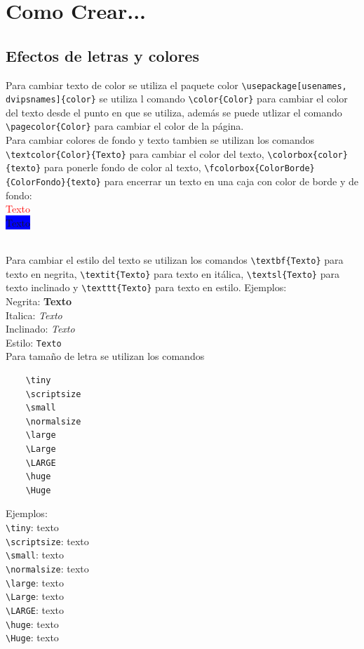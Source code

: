 \documentclass[10pt,journal,compsoc]{IEEEtran}
\begin{document}
\section{Como Crear...}
\subsection{Efectos de letras y colores}
Para cambiar texto de color se utiliza el paquete color \verb|\usepackage[usenames, dvipsnames]{color}| se utiliza l comando \verb|\color{Color}| para cambiar el color del texto desde el punto en que se utiliza, adem\'as se puede utlizar el comando \verb|\pagecolor{Color}| para cambiar el color de la p\'agina.\\
Para cambiar colores de fondo y texto tambien se utilizan los comandos \verb|\textcolor{Color}{Texto}| para cambiar el color del texto, \verb|\colorbox{color}{texto}| para ponerle fondo de color al texto, \verb|\fcolorbox{ColorBorde}{ColorFondo}{texto}| para encerrar un texto en una caja con color de borde y de fondo:\\
\textcolor{red}{Texto}\\\newline
\colorbox{blue}{Texto}\\\newline
{}\\\newline

Para cambiar el estilo del texto se utilizan los comandos \verb|\textbf{Texto}| para texto en negrita, \verb|\textit{Texto}| para texto en it\'alica, \verb|\textsl{Texto}| para texto inclinado y \verb|\texttt{Texto}| para texto en estilo. Ejemplos:\\
Negrita: \textbf{Texto}\\
Italica: \textit{Texto}\\
Inclinado: \textsl{Texto}\\
Estilo: \texttt{Texto}\\
Para tama\~no de letra se utilizan los comandos
\begin{lstlisting}
	\tiny
	\scriptsize
	\small
	\normalsize
	\large
	\Large
	\LARGE
	\huge
	\Huge
\end{lstlisting}
Ejemplos:\\
\verb|\tiny|: \tiny texto\\\normalsize
\verb|\scriptsize|: \scriptsize texto\\\normalsize
\verb|\small|: \small texto\\\normalsize
\verb|\normalsize|: \normalsize texto\\\normalsize
\verb|\large|: \large texto\\\normalsize
\verb|\Large|: \Large texto\\\normalsize
\verb|\LARGE|: \LARGE texto\\\normalsize
\verb|\huge|: \huge texto\\\normalsize
\verb|\Huge|: \Huge texto\\\normalsize
\normalsize
\end{document}
